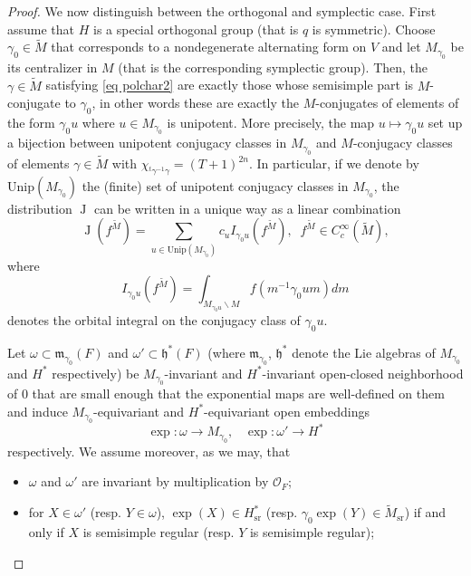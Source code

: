 \documentclass[12pt]{article}
\numberwithin{equation}{section}
\def\tM{\widetilde{M}}
\DeclareMathOperator{\sr}{sr}
\DeclareMathOperator{\rJ}{\mathrm{J}}
\begin{document}
\begin{proof}
		We now distinguish between the orthogonal and symplectic case. First assume that $H$ is a special orthogonal group (that is $q$ is symmetric). Choose $\gamma_0\in \tM$ that corresponds to a nondegenerate alternating form on $V$ and let $M_{\gamma_0}$ be its centralizer in $M$ (that is the corresponding symplectic group). Then, the $\gamma\in \tM$ satisfying \eqref{eq polchar2} are exactly those whose semisimple part is $M$-conjugate to $\gamma_0$, in other words these are exactly the $M$-conjugates of elements of the form $\gamma_0 u$ where $u\in M_{\gamma_0}$ is unipotent. More precisely, the map $u\mapsto \gamma_0 u$ set up a bijection between unipotent conjugacy classes in $M_{\gamma_0}$ and $M$-conjugacy classes of elements $\gamma\in \tM$ with $\chi_{{}^t \gamma^{-1}\gamma}=(T+1)^{2n}$. In particular, if we denote by $\mathrm{Unip}(M_{\gamma_0})$ the (finite) set of unipotent conjugacy classes in $M_{\gamma_0}$, the distribution $\rJ$ can be written in a unique way as a linear combination
		\begin{equation}\label{exp unip orb}
			\displaystyle \rJ(f^{\tM})=\sum_{u\in \mathrm{Unip}(M_{\gamma_0})} c_u I_{\gamma_0u}(f^{\tM}),\;\; f^{\tM}\in C_c^\infty(\tM),
		\end{equation}
		where
		$$\displaystyle I_{\gamma_0u}(f^{\tM})=\int_{M_{\gamma_0 u}\backslash M} f(m^{-1}\gamma_0 um) dm$$
		denotes the orbital integral on the conjugacy class of $\gamma_0 u$.
		
		Let $\omega\subset \mathfrak{m}_{\gamma_0}(F)$ and $\omega'\subset \mathfrak{h}^*(F)$ (where $\mathfrak{m}_{\gamma_0}$, $\mathfrak{h}^*$ denote the Lie algebras of $M_{\gamma_0}$ and $H^*$ respectively) be $M_{\gamma_0}$-invariant and $H^*$-invariant open-closed neighborhood of $0$ that are small enough that the exponential maps are well-defined on them and induce $M_{\gamma_0}$-equivariant and $H^*$-equivariant open embeddings
		$$\exp: \omega\to M_{\gamma_0},\;\;\; \exp: \omega'\to H^*$$
		respectively. We assume moreover, as we may, that 
		\begin{itemize}
			\item $\omega$ and $\omega'$ are invariant by multiplication by $\mathcal{O}_F$;
			
			\item for $X\in \omega'$ (resp. $Y\in \omega$), $\exp(X)\in H^*_{\sr}$ (resp. $\gamma_0\exp(Y)\in \tM_{\sr}$) if and only if $X$ is semisimple regular (resp. $Y$ is semisimple regular);
			

\end{itemize}
\end{proof}
\end{document}
